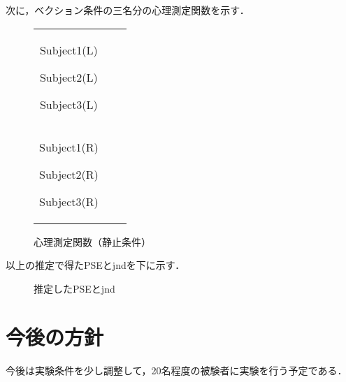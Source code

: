 \documentclass[12pt,a4j]{jsarticle}
\renewcommand{\ }{\hspace{1zw}}
\begin{document}
\raggedright
次に，ベクション条件の三名分の心理測定関数を示す．\\
\begin{figure}[htbp]
    \centering
    \begin{tabular}{ccc}
        \begin{minipage}{0.33\columnwidth}
            \centering
            Subject1(L)
        \end{minipage}
        \begin{minipage}{0.33\columnwidth}
            \centering
            Subject2(L)
        \end{minipage}
        \begin{minipage}{0.33\columnwidth}
            \centering
            Subject3(L)
        \end{minipage}\\
        \begin{minipage}{0.33\columnwidth}
            \centering
            Subject1(R)
        \end{minipage}
        \begin{minipage}{0.33\columnwidth}
            \centering
            Subject2(R)
        \end{minipage}
        \begin{minipage}{0.33\columnwidth}
            \centering
            Subject3(R)
        \end{minipage}
    \end{tabular}
    \caption{心理測定関数（静止条件）}
    \label{pf_v}
\end{figure}

\raggedright
以上の推定で得たPSEとjndを下に示す．\\
\begin{figure}[htbp]
    \centering
    \caption{推定したPSEとjnd}
    \label{table}
\end{figure}

\raggedright


\raggedright
\section{今後の方針}
今後は実験条件を少し調整して，20名程度の被験者に実験を行う予定である．
\end{document}
